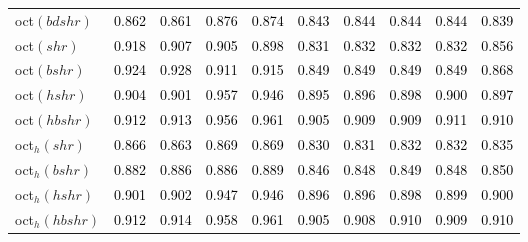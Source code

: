 \begin{tabular}[t]{l|ccccccccc}
oct$(bdshr)$ & \textcolor{black}{0.862} & \textcolor{black}{0.861} & \textcolor{black}{0.876} & \textcolor{black}{0.874} & \textcolor{black}{0.843} & \textcolor{black}{0.844} & \textcolor{black}{0.844} & \textcolor{black}{0.844} & \textcolor{black}{0.839}\\
oct$(shr)$ & \textcolor{black}{0.918} & \textcolor{black}{0.907} & \textcolor{black}{0.905} & \textcolor{black}{0.898} & \textcolor{black}{0.831} & \textcolor{black}{0.832} & \textcolor{black}{0.832} & \textcolor{black}{0.832} & \textcolor{black}{0.856}\\
oct$(bshr)$ & \textcolor{black}{0.924} & \textcolor{black}{0.928} & \textcolor{black}{0.911} & \textcolor{black}{0.915} & \textcolor{black}{0.849} & \textcolor{black}{0.849} & \textcolor{black}{0.849} & \textcolor{black}{0.849} & \textcolor{black}{0.868}\\
oct$(hshr)$ & \textcolor{black}{0.904} & \textcolor{black}{0.901} & \textcolor{black}{0.957} & \textcolor{black}{0.946} & \textcolor{black}{0.895} & \textcolor{black}{0.896} & \textcolor{black}{0.898} & \textcolor{black}{0.900} & \textcolor{black}{0.897}\\
oct$(hbshr)$ & \textcolor{black}{0.912} & \textcolor{black}{0.913} & \textcolor{black}{0.956} & \textcolor{black}{0.961} & \textcolor{black}{0.905} & \textcolor{black}{0.909} & \textcolor{black}{0.909} & \textcolor{black}{0.911} & \textcolor{black}{0.910}\\
oct$_h(shr)$ & \textcolor{black}{0.866} & \textcolor{black}{0.863} & \textcolor{black}{0.869} & \textcolor{black}{0.869} & \textcolor{black}{0.830} & \textcolor{black}{0.831} & \textcolor{black}{0.832} & \textcolor{black}{0.832} & \textcolor{black}{0.835}\\
oct$_h(bshr)$ & \textcolor{black}{0.882} & \textcolor{black}{0.886} & \textcolor{black}{0.886} & \textcolor{black}{0.889} & \textcolor{black}{0.846} & \textcolor{black}{0.848} & \textcolor{black}{0.849} & \textcolor{black}{0.848} & \textcolor{black}{0.850}\\
oct$_h(hshr)$ & \textcolor{black}{0.901} & \textcolor{black}{0.902} & \textcolor{black}{0.947} & \textcolor{black}{0.946} & \textcolor{black}{0.896} & \textcolor{black}{0.896} & \textcolor{black}{0.898} & \textcolor{black}{0.899} & \textcolor{black}{0.900}\\
oct$_h(hbshr)$ & \textcolor{black}{0.912} & \textcolor{black}{0.914} & \textcolor{black}{0.958} & \textcolor{black}{0.961} & \textcolor{black}{0.905} & \textcolor{black}{0.908} & \textcolor{black}{0.910} & \textcolor{black}{0.909} & \textcolor{black}{0.910}\\
\bottomrule
\end{tabular}
